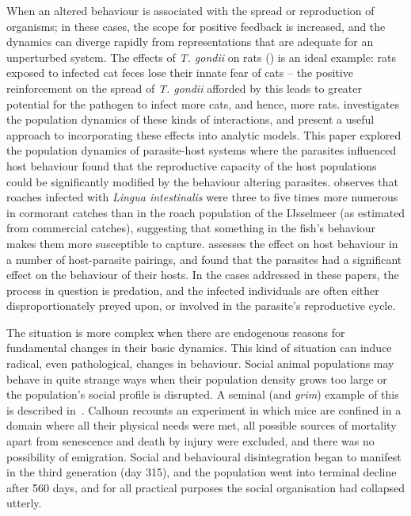When an altered behaviour is associated with the spread or
reproduction of organisms; in these cases, the scope for positive
feedback is increased, and the dynamics can diverge rapidly from
representations that are adequate for an unperturbed system.  The
effects of \emph{T. gondii} on rats (\citep{berdoy2000fatal}) is an
ideal example: rats exposed to infected cat feces lose their innate
fear of cats -- the positive reinforcement on the spread
of \emph{T. gondii} afforded by this leads to greater potential for
the pathogen to infect more cats, and hence, more
rats.  investigates the population
dynamics of these kinds of interactions, and present a useful approach
to incorporating these effects into analytic models. This paper
explored the population dynamics of parasite-host systems where the
parasites influenced host behaviour found that the reproductive
capacity of the host populations could be significantly modified by
the behaviour altering parasites.  observes that
roaches infected with \emph{Lingua intestinalis} were three to five
times more numerous in cormorant catches than in the roach population
of the IJsselmeer (as estimated from commercial catches), suggesting
that something in the fish's behaviour makes them more susceptible to
capture. \Cite{poulin1994meta} assesses the effect on host behaviour
in a number of host-parasite pairings, and found that the parasites
had a significant effect on the behaviour of their hosts.  In the
cases addressed in these papers, the process in question is predation,
and the infected individuals are often either disproportionately
preyed upon, or involved in the parasite's reproductive cycle.

The situation is more complex when there are endogenous reasons for
fundamental changes in their basic dynamics. This kind of situation
can induce radical, even pathological, changes in behaviour.  Social
animal populations may behave in quite strange ways when their
population density grows too large or the population's social profile
is disrupted.  A seminal (and \emph{grim}) example of this is described
in~\cite{calhoun1973death}. Calhoun recounts an experiment in which
mice are confined in a domain where all their physical needs were met,
all possible sources of mortality apart from senescence and death by
injury were excluded, and there was no possibility of emigration.
Social and behavioural disintegration began to manifest in the third
generation (day 315), and the population went into terminal decline
after 560 days, and for all practical purposes the social organisation
had collapsed utterly.


